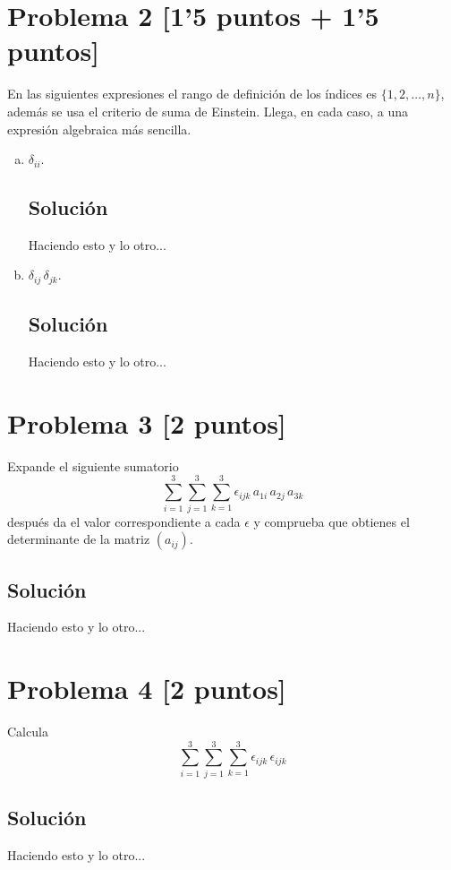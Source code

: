 \documentclass[12pt,reqno]{article}
\begin{document}
	\section*{Problema 2 [1'5 puntos + 1'5 puntos]}
	En las siguientes expresiones el rango de definición de los índices es $\{1,2,\ldots,n\}$, además se usa el criterio de suma de Einstein. Llega, en cada caso, a una expresión algebraica más sencilla.
	\begin{enumerate}[(a)]
		\item $\delta_{ii}$.
		\subsection*{Solución}
		Haciendo esto y lo otro...
		\item $\delta_{ij}\,\delta_{jk}$.
		\subsection*{Solución}
		Haciendo esto y lo otro...
	\end{enumerate}
	
	\section*{Problema 3 [2 puntos]}
	Expande el siguiente sumatorio
	\begin{equation*}
		\sum_{i=1}^{3}\sum_{j=1}^{3}\sum_{k=1}^{3}\epsilon_{ijk}\,a_{1i}\,a_{2j}\,a_{3k}
	\end{equation*}
	después da el valor correspondiente a cada $\epsilon$ y comprueba que obtienes el determinante de la matriz $(a_{ij})$.
	\subsection*{Solución}
	Haciendo esto y lo otro...
	
	\section*{Problema 4 [2 puntos]}
	Calcula
	\begin{equation*}
		\sum_{i=1}^{3}\sum_{j=1}^{3}\sum_{k=1}^{3}\epsilon_{ijk}\,\epsilon_{ijk}
	\end{equation*}
	\subsection*{Solución}
	Haciendo esto y lo otro...
	
	
	
\end{document}
